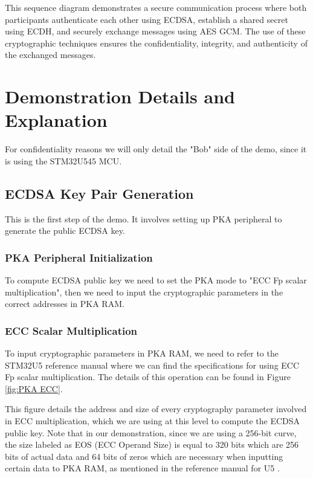 This sequence diagram demonstrates a secure communication process where both participants authenticate each other using ECDSA, establish a shared secret using ECDH, and securely exchange messages using AES GCM. The use of these cryptographic techniques ensures the confidentiality, integrity, and authenticity of the exchanged messages.

\section{Demonstration Details and Explanation}
For confidentiality reasons we will only detail the "Bob" side of the demo, since it is using the STM32U545 MCU.

\subsection{ECDSA Key Pair Generation}
This is the first step of the demo. It involves setting up PKA peripheral to generate the public ECDSA key.
    \subsubsection{PKA Peripheral Initialization}
        To compute ECDSA public key we need to set the PKA mode to "ECC Fp scalar multiplication", then we need to input the cryptographic parameters in the correct addresses in PKA RAM.
    \subsubsection{ECC Scalar Multiplication }
        To input cryptographic parameters in PKA RAM, we need to refer to the STM32U5 reference manual \cite{U5_Refman} where we can find the specifications for using ECC Fp scalar multiplication.
        The details of this operation can be found in Figure \ref{fig:PKA ECC}.

         This figure details the address and size of every cryptography parameter involved in ECC multiplication, which we are using at this level to compute the ECDSA public key.
 Note that in our demonstration, since we are using a 256-bit curve, the size labeled as EOS (ECC Operand Size) is equal to 320 bits which are 256 bits of actual data and 64 bits of zeros which are necessary when inputting certain data to PKA RAM, as mentioned in the reference manual for U5 \cite{U5_Refman}.

